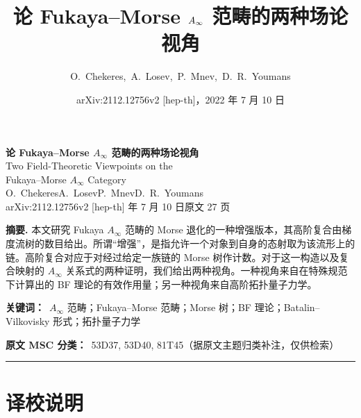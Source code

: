 \documentclass[11pt,a4paper,UTF8,fontset=windows]{ctexart}
\title{论 Fukaya--Morse $\Ainf$ 范畴的两种场论视角}
\author{O.~Chekeres,\ A.~Losev,\ P.~Mnev,\ D.~R.~Youmans}
\date{arXiv:2112.12756v2 [hep-th]，2022 年 7 月 10 日}
\newcommand{\Ainf}{A_\infty}
\begin{document}
\begin{center}
  {\LARGE\bfseries 论 Fukaya--Morse $\Ainf$ 范畴的两种场论视角}\\[8pt]
  {\large Two Field-Theoretic Viewpoints on the\\ Fukaya--Morse $\Ainf$ Category}\\[12pt]
  {\large O.~Chekeres\quad A.~Losev\quad P.~Mnev\quad D.~R.~Youmans}\\[6pt]
  {\small arXiv:2112.12756v2 [hep-th] 年 7 月 10 日\quad 原文 27 页}
\end{center}

\vspace{0.5em}
\noindent\textbf{摘要.}\quad
本文研究 Fukaya $\Ainf$ 范畴的 Morse 退化的一种增强版本，其高阶复合由梯度流树的数目给出。所谓“增强”，是指允许一个对象到自身的态射取为该流形上的链。高阶复合对应于对经过给定一族链的 Morse 树作计数。对于这一构造以及复合映射的 $\Ainf$ 关系式的两种证明，我们给出两种视角。一种视角来自在特殊规范下计算出的 BF 理论的有效作用量；另一种视角来自高阶拓扑量子力学。

\vspace{0.6em}
\noindent\textbf{关键词：}\ $\Ainf$ 范畴；Fukaya--Morse 范畴；Morse 树；BF 理论；Batalin--Vilkovisky 形式；拓扑量子力学

\vspace{0.4em}
\noindent\textbf{原文 MSC 分类：}\ 53D37, 53D40, 81T45（据原文主题归类补注，仅供检索）

\medskip
\noindent\rule{\linewidth}{0.4pt}

\section*{译校说明}
\end{document}
